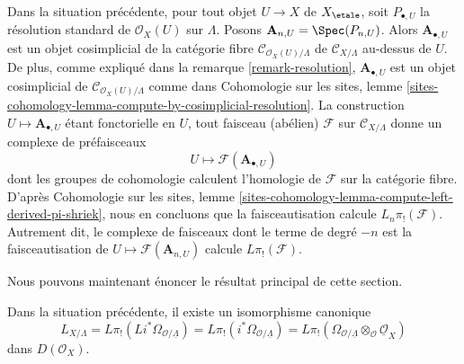 \begin{remark}
\label{remark-compute-L-pi-shriek-spaces}
Dans la situation précédente, pour tout objet $U \to X$ de $X_\etale$, soit
$P_{\bullet, U}$ la résolution standard de $\mathcal{O}_X(U)$ sur $\Lambda$.
Posons $\mathbf{A}_{n, U} = \Spec(P_{n, U})$. Alors
$\mathbf{A}_{\bullet, U}$ est un objet cosimplicial de la catégorie fibre
$\mathcal{C}_{\mathcal{O}_X(U)/\Lambda}$ de $\mathcal{C}_{X/\Lambda}$ au-dessus
de $U$. De plus, comme expliqué dans la remarque \ref{remark-resolution},
$\mathbf{A}_{\bullet, U}$ est un objet cosimplicial de
$\mathcal{C}_{\mathcal{O}_X(U)/\Lambda}$ comme dans Cohomologie sur les sites,
lemme \ref{sites-cohomology-lemma-compute-by-cosimplicial-resolution}. La
construction $U \mapsto \mathbf{A}_{\bullet, U}$ étant fonctorielle en $U$,
tout faisceau (abélien) $\mathcal{F}$ sur $\mathcal{C}_{X/\Lambda}$ donne un
complexe de préfaisceaux
$$
U \longmapsto \mathcal{F}(\mathbf{A}_{\bullet, U})
$$
dont les groupes de cohomologie calculent l'homologie de $\mathcal{F}$ sur la
catégorie fibre. D'après Cohomologie sur les sites, lemme
\ref{sites-cohomology-lemma-compute-left-derived-pi-shriek}, nous en concluons
que la faisceautisation calcule $L_n\pi_!(\mathcal{F})$. Autrement dit, le
complexe de faisceaux dont le terme de degré $-n$ est la faisceautisation de
$U \mapsto \mathcal{F}(\mathbf{A}_{n, U})$ calcule $L\pi_!(\mathcal{F})$.
\end{remark}

\noindent
Nous pouvons maintenant énoncer le résultat principal de cette section.

\begin{lemma}
\label{lemma-cotangent-morphism-spaces}
Dans la situation précédente, il existe un isomorphisme canonique
$$
L_{X/\Lambda} = 
L\pi_!(Li^*\Omega_{\mathcal{O}/\underline{\Lambda}}) =
L\pi_!(i^*\Omega_{\mathcal{O}/\underline{\Lambda}}) =
L\pi_!(\Omega_{\mathcal{O}/\underline{\Lambda}}
\otimes_\mathcal{O} \underline{\mathcal{O}}_X)
$$
dans $D(\mathcal{O}_X)$.
\end{lemma}

